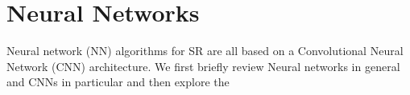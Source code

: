 %
\section{Neural Networks}\label{sec:neural-networks}
\localtableofcontents

Neural network (NN) algorithms for SR are all based on a Convolutional Neural Network (CNN) architecture. 
%
We first briefly review Neural networks in general and CNNs in particular and then explore the 

